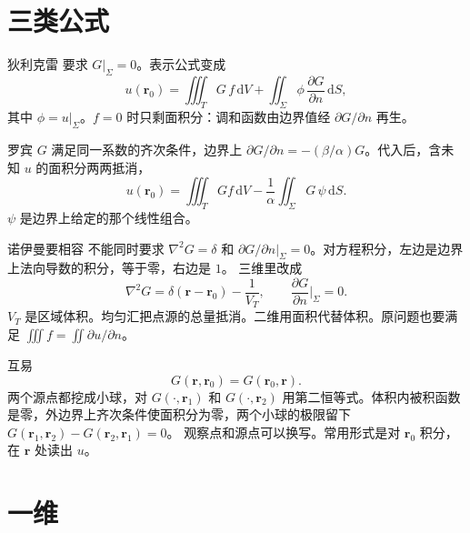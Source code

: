 \documentclass[fontset=windows, chinese, 10pt, xcolor=dvipsnames]{beamer}
\begin{document}
\section{三类公式}

\begin{frame}{狄利克雷}
  要求 $G|_{\Sigma}=0$。表示公式变成
  \begin{equation*}
    \boxed{\displaystyle
    u(\mathbf{r}_0)
    =\iiint_T G\,f\,\mathrm{d}V
    +\iint_{\Sigma}\phi\,\frac{\partial G}{\partial n}\,\mathrm{d}S,}
  \end{equation*}
  其中 $\phi=u|_{\Sigma}$。$f=0$ 时只剩面积分：调和函数由边界值经 $\partial G/\partial n$ 再生。
\end{frame}

\begin{frame}{罗宾}
  $G$ 满足同一系数的齐次条件，边界上 $\partial G/\partial n=-(\beta/\alpha)G$。代入后，含未知 $u$ 的面积分两两抵消，
  \[
    u(\mathbf{r}_0)
    =\iiint_T G f\,\mathrm{d}V
    -\frac{1}{\alpha}\iint_{\Sigma} G\,\psi\,\mathrm{d}S.
  \]
  $\psi$ 是边界上给定的那个线性组合。
\end{frame}

\begin{frame}{诺伊曼要相容}
  不能同时要求 $\nabla^2 G=\delta$ 和 $\partial G/\partial n|_{\Sigma}=0$。对方程积分，左边是边界上法向导数的积分，等于零，右边是 $1$。
  \vspace{0.4em}
  三维里改成
  \[
    \nabla^2 G=\delta(\mathbf{r}-\mathbf{r}_0)-\frac{1}{V_T},
    \qquad
    \frac{\partial G}{\partial n}\Big|_{\Sigma}=0.
  \]
  $V_T$ 是区域体积。均匀汇把点源的总量抵消。二维用面积代替体积。原问题也要满足 $\iiint f=\iint\partial u/\partial n$。
\end{frame}

\begin{frame}{互易}
  \begin{equation*}
    \boxed{\displaystyle G(\mathbf{r},\mathbf{r}_0)=G(\mathbf{r}_0,\mathbf{r}).}
  \end{equation*}
  两个源点都挖成小球，对 $G(\cdot,\mathbf{r}_1)$ 和 $G(\cdot,\mathbf{r}_2)$ 用第二恒等式。体积内被积函数是零，外边界上齐次条件使面积分为零，两个小球的极限留下 $G(\mathbf{r}_1,\mathbf{r}_2)-G(\mathbf{r}_2,\mathbf{r}_1)=0$。
  \vspace{0.35em}
  观察点和源点可以换写。常用形式是对 $\mathbf{r}_0$ 积分，在 $\mathbf{r}$ 处读出 $u$。
\end{frame}

\section{一维}
\end{document}
